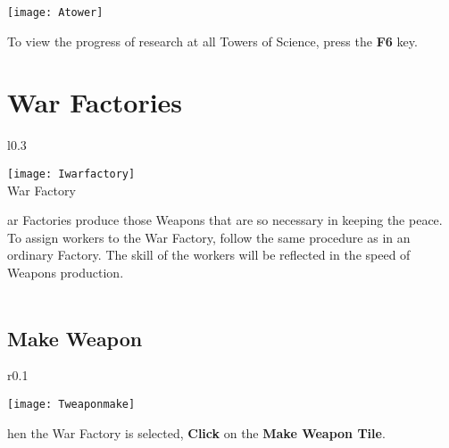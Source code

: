 \begin{center}
    \texttt{[image: Atower]} %
\end{center}


To view the progress of research at all Towers of Science, press the \textbf{F6} key.

\section{\textsf{War Factories}}


\begin{wrapfigure}{l}{0.3\textwidth}
    \vspace{-20pt}
    \begin{center}
        \texttt{[image: Iwarfactory]} %
        \\ War Factory
    \end{center}
    \vspace{-30pt}
\end{wrapfigure}

ar Factories produce those Weapons that are so necessary in keeping the peace. To assign workers to the War Factory, follow the same procedure as in an ordinary Factory. The skill of the workers will be reflected in the speed of Weapons production. \\ \\ %

\subsection{\textsf{Make Weapon}}


\begin{wrapfigure}{r}{0.1\textwidth}
    \vspace{-20pt}
    \begin{center}
        \texttt{[image: Tweaponmake]}
    \end{center}
    \vspace{-20pt}
\end{wrapfigure}

hen the War Factory is selected, \textbf{Click} on the \textbf{Make Weapon Tile}.

